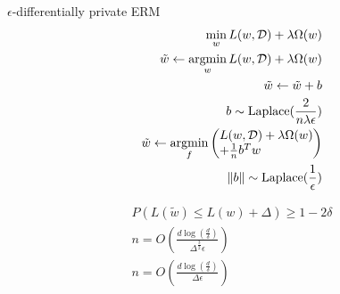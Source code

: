 \documentclass[11pt]{article}
\newcommand{\Dc}{\mathcal{D}}
\DeclareMathOperator*{\argmin}{argmin}
\DeclarePairedDelimiter{\norm}{\lVert}{\rVert}
\begin{document}
$\epsilon$-differentially private ERM
\begin{align*}
\min_{w} L(w, \Dc) + \lambda \Omega(w)\\
\tilde{w} \leftarrow \argmin_{w} L(w, \Dc) + \lambda \Omega(w)\\
\tilde{w} \leftarrow \tilde{w} + b\\
b\sim \text{Laplace}(\frac{2}{n\lambda\epsilon})\\
\tilde{w} \leftarrow \argmin_f \begin{pmatrix*}[l]
L(w, \Dc) + \lambda \Omega(w) \\+ \frac{1}{n}b^T w
\end{pmatrix*}\\
\norm{b}\sim \text{Laplace}(\frac{1}{\epsilon})
\end{align*}

\begin{align*}
P(L(\tilde{w}) \le L(w) + \Delta) \ge 1 - 2\delta\\
n = O(\frac{d\log{(\frac{d}{\delta})}}{\Delta^{\frac{3}{2}}\epsilon})\\
n = O(\frac{d\log{(\frac{d}{\delta})}}{\Delta \epsilon})
\end{align*}
\end{document}
